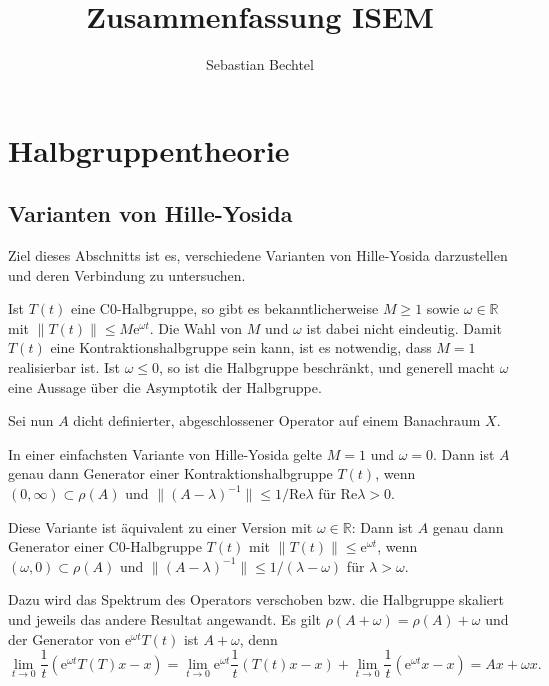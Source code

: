 \documentclass[11pt,a4paper]{scrartcl}
\newcommand{\R}{\mathbb{R}} %
\theoremstyle{plain}
\theoremstyle{definition}
\theoremstyle{remark}
\renewcommand{\Re}{\mathrm{Re}}
\begin{document}
\title{Zusammenfassung ISEM}
\author{Sebastian Bechtel}
\maketitle

\section{Halbgruppentheorie}

\subsection{Varianten von Hille-Yosida}

Ziel dieses Abschnitts ist es, verschiedene Varianten von Hille-Yosida darzustellen und deren Verbindung zu untersuchen.

Ist $T(t)$ eine C0-Halbgruppe, so gibt es bekanntlicherweise $M\geq 1$ sowie $\omega\in \R$ mit $\|T(t)\|\leq M \mathrm{e}^{\omega t}$. Die Wahl von $M$ und $\omega$ ist dabei nicht eindeutig. Damit $T(t)$ eine Kontraktionshalbgruppe sein kann, ist es notwendig, dass $M=1$ realisierbar ist. Ist $\omega\leq 0$, so ist die Halbgruppe beschränkt, und generell macht $\omega$ eine Aussage über die Asymptotik der Halbgruppe.

Sei nun $A$ dicht definierter, abgeschlossener Operator auf einem Banachraum $X$.

In einer einfachsten Variante von Hille-Yosida gelte $M=1$ und $\omega=0$. Dann ist $A$ genau dann Generator einer Kontraktionshalbgruppe $T(t)$, wenn $(0,\infty) \subset \rho(A)$ und $\|(A-\lambda)^{-1}\|\leq 1/\Re \lambda$ für $\Re \lambda > 0$.

Diese Variante ist äquivalent zu einer Version mit $\omega\in \R$: Dann ist $A$ genau dann Generator einer C0-Halbgruppe $T(t)$ mit $\|T(t)\|\leq \mathrm{e}^{\omega t}$, wenn $(\omega, 0)\subset \rho(A)$ und $\|(A-\lambda)^{-1}\|\leq 1/(\lambda-\omega)$ für $\lambda > \omega$.

Dazu wird das Spektrum des Operators verschoben bzw. die Halbgruppe skaliert und jeweils das andere Resultat angewandt. Es gilt $\rho(A+\omega) = \rho(A)+\omega$ und der Generator von $\mathrm{e}^{\omega t}T(t)$ ist $A+\omega$, denn $$\lim_{t\to 0} \frac{1}{t} \left( \mathrm{e}^{\omega t} T(T)x-x\right) = \lim_{t\to 0} \mathrm{e}^{\omega t} \frac{1}{t} \left( T(t)x-x \right) + \lim_{t\to 0} \frac{1}{t} \left( \mathrm{e}^{\omega t}x -x \right) = Ax+\omega x.$$
\end{document}
